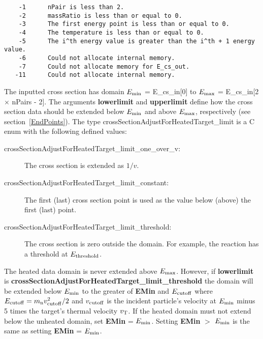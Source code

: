 \documentclass[11pt,twoside]{article}
\begin{document}
\begin{verbatim}
    -1      nPair is less than 2.
    -2      massRatio is less than or equal to 0.
    -3      The first energy point is less than or equal to 0.
    -4      The temperature is less than or equal to 0.
    -5      The i^th energy value is greater than the i^th + 1 energy value.
    -6      Could not allocate internal memory.
    -7      Could not allocate memory for E_cs_out.
   -11      Could not allocate internal memory.
\end{verbatim}

The inputted cross section has domain $E_{\rm min}$ = E\_cs\_in[0] to $E_{\rm max}$ = E\_cs\_in[2 $\times$ nPairs - 2]. The arguments {\bf lowerlimit}
and {\bf upperlimit} define how the cross section data should be extended below $E_{\rm min}$ and above $E_{\rm max}$, respectively (see 
section~\ref{EndPoints}). The type crossSectionAdjustForHeatedTarget\_limit is a C enum with the following defined values:
\begin{description}
\item[crossSectionAdjustForHeatedTarget\_limit\_one\_over\_v:] The cross section is extended as $1/v$.

\item[crossSectionAdjustForHeatedTarget\_limit\_constant:] The first (last) cross section point is used as the value below (above) the first (last)
    point.

\item[crossSectionAdjustForHeatedTarget\_limit\_threshold:] The cross section is zero outside the domain. For example, the reaction has
    a threshold at $E_{\rm threshold}$. 
\end{description}
The heated data domain is never extended above $E_{\rm max}$. However, if {\bf lowerlimit} is 
{\bf crossSectionAdjustForHeatedTarget\_\-limit\_\-threshold} the domain will be extended below $E_{\rm min}$ to the
greater of {\bf EMin} and $E_{\rm cutoff}$ where $E_{\rm cutoff} = m_{\rm n} v_{\rm cutoff}^2 / 2$ and $v_{\rm cutoff}$ is
the incident particle's velocity at $E_{\rm min}$ minus 5 times the target's thermal velocity $v_{\rm T}$. If the heated
domain must not extend below the unheated domain, set {\bf EMin} = $E_{\rm min}$. Setting {\bf EMin} $>$ $E_{\rm min}$ is the
same as setting {\bf EMin} = $E_{\rm min}$.
\end{document}
